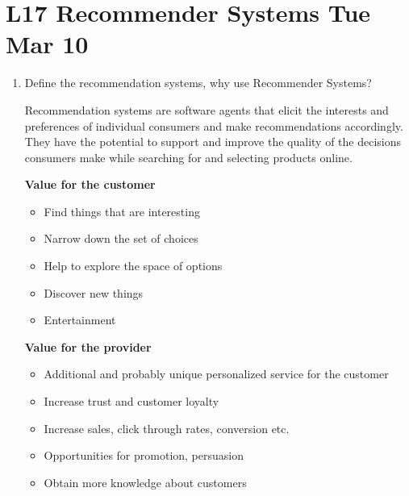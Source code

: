 \documentclass[12pt]{article}
\newenvironment{QandA}{\begin{enumerate}[label=\bfseries\arabic*.]\bfseries}
{\end{enumerate}}
\newenvironment{answered}{\par\normalfont\color{Sepia}}{}
\begin{document}
\section*{L17 Recommender Systems \textemdash{} Tue Mar 10}
\begin{QandA}

    \item Define the recommendation systems, why use Recommender Systems?
    \begin{answered}
        Recommendation systems are software agents that elicit the interests 
        and preferences of individual consumers and make recommendations accordingly.
        They have the potential to support and improve the quality of the decisions 
        consumers make while searching for and selecting products online.

        \textbf{Value for the customer}
        \begin{itemize}
            \item Find things that are interesting
            \item Narrow down the set of choices
            \item Help to explore the space of options
            \item Discover new things
            \item Entertainment
        \end{itemize}
        \textbf{Value for the provider}
        \begin{itemize}
            \item Additional and probably unique personalized service for the customer
            \item Increase trust and customer loyalty
            \item Increase sales, click through rates, conversion etc.
            \item Opportunities for promotion, persuasion
            \item Obtain more knowledge about customers
        \end{itemize}
    \end{answered}
    

\end{QandA}
\end{document}
